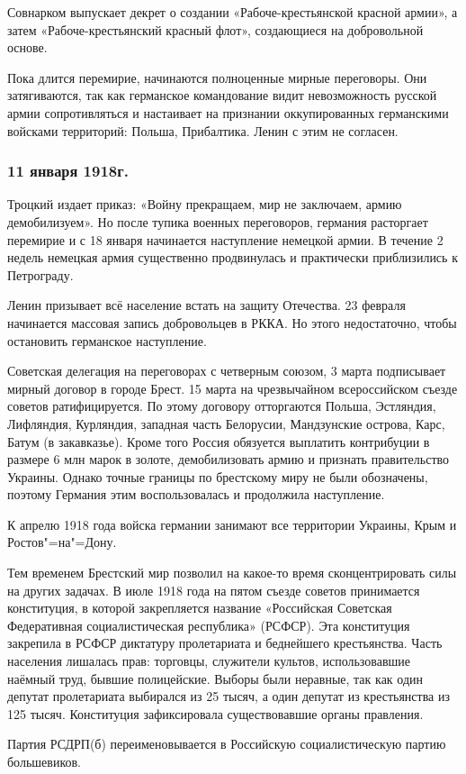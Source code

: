 Совнарком выпускает декрет о создании «Рабоче-крестьянской красной армии», а затем «Рабоче-крестьянский красный флот», создающиеся на добровольной основе.

Пока длится перемирие, начинаются полноценные мирные переговоры. Они затягиваются, так как германское командование видит невозможность русской армии сопротивляться и настаивает на признании оккупированных германскими войсками территорий: Польша, Прибалтика. Ленин с этим не согласен.

\subsubsection{\textbf{11 января 1918г.}}

Троцкий издает приказ: «Войну прекращаем, мир не заключаем, армию демобилизуем». Но после тупика военных переговоров, германия расторгает перемирие и с 18 января начинается наступление немецкой армии. В течение 2 недель немецкая армия существенно продвинулась и практически приблизились к Петрограду.

Ленин призывает всё население встать на защиту Отечества. 23 февраля начинается массовая запись добровольцев в РККА. Но этого недостаточно, чтобы остановить германское наступление.

Советская делегация на переговорах с четверным союзом, 3 марта подписывает мирный договор в городе Брест. 15 марта на чрезвычайном всероссийском съезде советов ратифицируется. По этому договору отторгаются Польша, Эстляндия, Лифляндия, Курляндия, западная часть Белорусии, Мандзунские острова, Карс, Батум (в закавказье). Кроме того Россия обязуется выплатить контрибуции в размере 6 млн марок в золоте, демобилизовать армию и признать правительство Украины. Однако точные границы по брестскому миру не были обозначены, поэтому Германия этим воспользовалась и продолжила наступление.

К апрелю 1918 года войска германии занимают все территории Украины, Крым и Ростов"=на"=Дону.

Тем временем Брестский мир позволил на какое-то время сконцентрировать силы на других задачах. В июле 1918 года на пятом съезде советов принимается конституция, в которой закрепляется название «Российская Советская Федеративная социалистическая республика» (РСФСР). Эта конституция закрепила в РСФСР диктатуру пролетариата и беднейшего крестьянства. Часть населения лишалась прав: торговцы, служители культов, использовавшие наёмный труд, бывшие полицейские. Выборы были неравные, так как один депутат пролетариата выбирался из 25 тысяч, а один депутат из крестьянства из 125 тысяч. Конституция зафиксировала существовавшие органы правления.

Партия РСДРП(б) переименовывается в Российскую социалистическую партию большевиков.